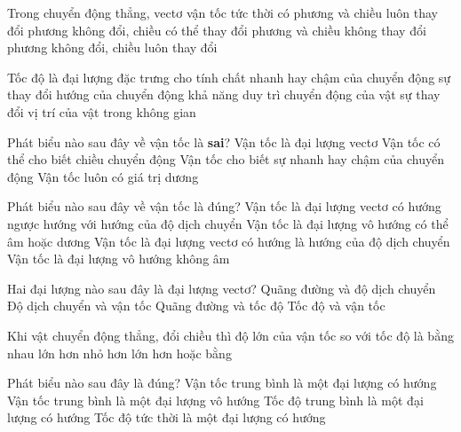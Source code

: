 \begin{ex}%
Trong chuyển động thẳng, vectơ vận tốc tức thời có
\choice
{phương và chiều luôn thay đổi}
{phương không đổi, chiều có thể thay đổi}
{\True phương và chiều không thay đổi}
{phương không đổi, chiều luôn thay đổi}
\loigiai{
}
 \end{ex}
\begin{ex}%
Tốc độ là đại lượng đặc trưng cho
\choice
{\True tính chất nhanh hay chậm của chuyển động}
{sự thay đổi hướng của chuyển động}
{khả năng duy trì chuyển động của vật}
{sự thay đổi vị trí của vật trong không gian}
\loigiai{
}
 \end{ex}
\begin{ex}%
Phát biểu nào sau đây về vận tốc là \textbf{sai}?
\choice
{Vận tốc là đại lượng vectơ}
{Vận tốc có thể cho biết chiều chuyển động}
{Vận tốc cho biết sự nhanh hay chậm của chuyển động}
{\True Vận tốc luôn có giá trị dương}
\loigiai{

}
 \end{ex}
\begin{ex}%
Phát biểu nào sau đây về vận tốc là đúng?
\choice
{Vận tốc là đại lượng vectơ có hướng ngược hướng với hướng của độ dịch chuyển}
{Vận tốc là đại lượng vô hướng có thể âm hoặc dương}
{\True Vận tốc là đại lượng vectơ có hướng là hướng của độ dịch chuyển}
{Vận tốc là đại lượng vô hướng không âm}
\loigiai{

}
 \end{ex}
\begin{ex}%
Hai đại lượng nào sau đây là đại lượng vectơ?
\choice
{Quãng đường và độ dịch chuyển}
{\True Độ dịch chuyển và vận tốc}
{Quãng đường và tốc độ}
{Tốc độ và vận tốc}

\loigiai{
}
 \end{ex}
\begin{ex}%
Khi vật chuyển động thẳng, đổi chiều thì độ lớn của vận tốc so với tốc độ là
\choice
{bằng nhau}
{lớn hơn}
{\True nhỏ hơn}
{lớn hơn hoặc bằng}
\loigiai{

}
 \end{ex}
\begin{ex}%
Phát biểu nào sau đây là đúng?
\choice
{\True Vận tốc trung bình là một đại lượng có hướng}
{Vận tốc trung bình là một đại lượng vô hướng}
{Tốc độ trung bình là một đại lượng có hướng}
{Tốc độ tức thời là một đại lượng có hướng}
\loigiai{
}
 \end{ex}
